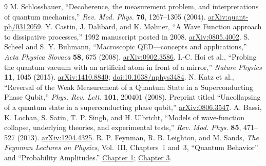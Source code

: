 \documentclass[11pt]{article}
\begin{document}
\begin{thebibliography}{9}
 M. Schlosshauer, ``Decoherence, the measurement problem, and interpretations of quantum mechanics,'' \emph{Rev. Mod. Phys.} \textbf{76}, 1267--1305 (2004). \href{https://arxiv.org/abs/quant-ph/0312059}{arXiv:quant-ph/0312059}.
 Y. Castin, J. Dalibard, and K. M\o lmer, ``A Wave Function approach to dissipative processes,'' 1992 manuscript posted in 2008. \href{https://arxiv.org/abs/0805.4002}{arXiv:0805.4002}.
 S. Scheel and S. Y. Buhmann, ``Macroscopic QED---concepts and applications,'' \emph{Acta Physica Slovaca} \textbf{58}, 675 (2008). \href{https://arxiv.org/abs/0902.3586}{arXiv:0902.3586}.
 I.-C. Hoi et al., ``Probing the quantum vacuum with an artificial atom in front of a mirror,'' \emph{Nature Physics} \textbf{11}, 1045 (2015). \href{https://arxiv.org/abs/1410.8840}{arXiv:1410.8840}; \href{https://doi.org/10.1038/nphys3484}{doi:10.1038/nphys3484}.
 N. Katz et al., ``Reversal of the Weak Measurement of a Quantum State in a Superconducting Phase Qubit,'' \emph{Phys. Rev. Lett.} \textbf{101}, 200401 (2008). Preprint titled ``Uncollapsing of a quantum state in a superconducting phase qubit,'' \href{https://arxiv.org/abs/0806.3547}{arXiv:0806.3547}.
 A. Bassi, K. Lochan, S. Satin, T. P. Singh, and H. Ulbricht, ``Models of wave-function collapse, underlying theories, and experimental tests,'' \emph{Rev. Mod. Phys.} \textbf{85}, 471--527 (2013). \href{https://arxiv.org/abs/1204.4325}{arXiv:1204.4325}.
 R. P. Feynman, R. B. Leighton, and M. Sands, \emph{The Feynman Lectures on Physics}, Vol.~III, Chapters~1 and~3, ``Quantum Behavior'' and ``Probability Amplitudes.'' \href{https://www.feynmanlectures.caltech.edu/III_01.html}{Chapter 1}; \href{https://www.feynmanlectures.caltech.edu/III_03.html}{Chapter 3}.
\end{thebibliography}
\end{document}
